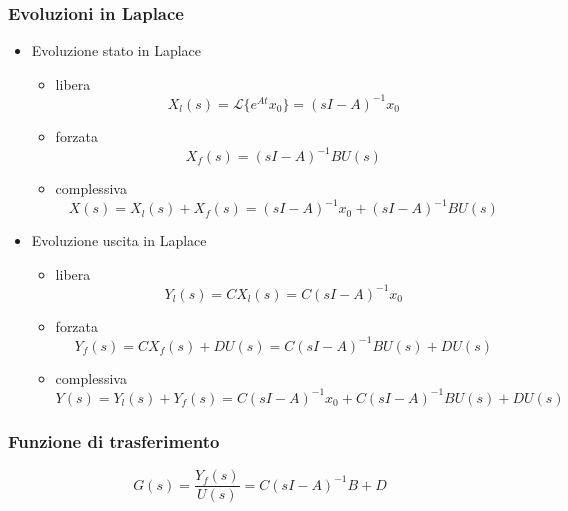\documentclass[11pt]{article}
\begin{document}
\subsubsection{Evoluzioni in Laplace}
\label{sec:org170c11c}
\begin{itemize}
\item Evoluzione stato in Laplace
\begin{itemize}
\item libera
\[X_l (s) = \mathcal{L} \{e^{At} x_0\} = (sI - A)^{-1} x_0\]
\item forzata
\[X_f (s) = (sI - A)^{-1} BU(s)\]
\item complessiva
\[X(s) = X_l (s) + X_f (s) =
	    (sI - A)^{-1} x_0 + (sI - A)^{-1} BU(s) \]
\end{itemize}

\item Evoluzione uscita in Laplace
\begin{itemize}
\item libera
\[Y_l (s) = C X_l (s) = C(sI - A)^{-1} x_0\]
\item forzata
\[Y_f (s) = C X_f (s) + D U(s) = C(sI - A)^{-1} BU(s) + DU(s)\]
\item complessiva
\[Y(s) = Y_l (s) + Y_f (s) =
	    C(sI - A)^{-1} x_0 + C(sI - A)^{-1} BU(s) + DU(s) \]
\end{itemize}
\end{itemize}

\subsubsection{Funzione di trasferimento}
\label{sec:org5fb6766}
\[G(s) = \frac{Y_f(s)}{U(s)} = C(sI-A)^{-1}B + D\]
\end{document}
